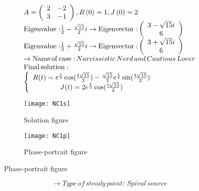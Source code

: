 \documentclass[a4paper]{article}
\begin{document}
\[\begin{array}{l}
A = \left( {\begin{array}{*{20}{c}}
2&{ - 2}\\
3&{ - 1}
\end{array}} \right),R\left( 0 \right) = 1,J\left( 0 \right) = 2\\
{\rm{Eigenvalue:}}\frac{1}{2} - \frac{{\sqrt {15} }}{2}i \to {\rm{Eigenvector:}}\left( {\begin{array}{*{20}{c}}
{3 - \sqrt {15} i}\\
6
\end{array}} \right)\\
{\rm{Eigenvalue:}}\frac{1}{2} + \frac{{\sqrt {15} }}{2}i \to {\rm{Eigenvector:}}\left( {\begin{array}{*{20}{c}}
{3 + \sqrt {15} i}\\
6
\end{array}} \right)\\
 \to {\rm{Name}}\,{\rm{of}}\,{\rm{case:}}\,Narcissistic\,Nerd\,and\,Cautious\,Lover\\
{\rm{Final}}\,{\rm{solution:}}\\
\left\{ {\begin{array}{*{20}{c}}
{R(t) = {e^{\frac{t}{2}}}\cos (\frac{{t\sqrt {15} }}{2}) - \frac{{\sqrt {15} }}{3}{e^{\frac{t}{2}}}\sin (\frac{{t\sqrt {15} }}{2})}\\
{J(t) = 2{e^{\frac{t}{2}}}\cos (\frac{{t\sqrt {15} }}{2})}
\end{array}} \right.
\end{array}\]
\begin{figure}[H]
\centering
\begin{subfigure}{.5\textwidth}
  \centering
  \texttt{[image: NC1s]}
  \caption*{Solution figure}
\end{subfigure}%
\begin{subfigure}{.5\textwidth}
  \centering
  \texttt{[image: NC1p]}
  \caption*{Phase-portrait figure}
\end{subfigure}
\end{figure}
\[  \to  Type\,of\,steady\,point:\,Spiral\,source\]
\end{document}
